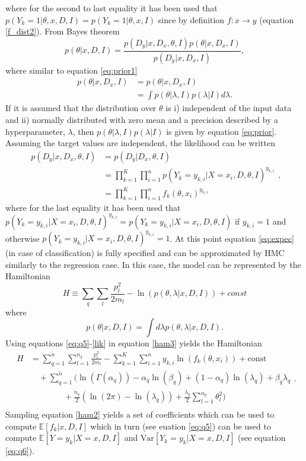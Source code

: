 where for the second to last equality it has been used that $p(Y_k=1|\theta,x,D,I) = p(Y_k=1|\theta,x,I)$ since by definition $f: x\rightarrow y$ (equation \eqref{f_dist2}). From Bayes theorem
\begin{equation}
	p(\theta|x,D,I) =\frac{p(D_y|x,D_x,\theta,I)p(\theta|x,D_x,I)}{p(D_y|x,D_x,I)},
\end{equation}
where similar to equation \eqref{eq:prior1}
\begin{equation}
	\begin{split}
		p(\theta|x,D_x,I) & = p(\theta|x,D_x,I)\\
		& = \int p(\theta|\lambda,I)p(\lambda|I)d\lambda.
	\end{split}
\end{equation}
If it is assumed that the distribution over $\theta$ is i) independent of the input data and ii) normally distributed with zero mean and a precision described by a hyperparameter, $\lambda$, then $p(\theta|\lambda,I)p(\lambda|I)$ is given by equation \eqref{eq:prior}. Assuming the target values are independent, the likelihood can be written~\citep{Fischer1999} 
\begin{equation}
	\begin{split}
		p(D_y|x,D_x,\theta,I) &= p(D_y|D_x,\theta,I)\\
		&=\prod_{k=1}^K\prod_{i=1}^{n}p(Y_k = y_{k,i}|X = x_{i},D,\theta,I)^{y_{k,i}}\\
		&=\prod_{k=1}^K\prod_{i=1}^{n}f_k(\theta,x_i)^{y_{k,i}}
	\end{split},
	\label{lik}
\end{equation}
where for the last equality it has been used that $p(Y_k = y_{k,i}|X = x_{i},D,\theta,I)^{y_{k,i}} = p(Y_k = y_{k,i}|X = x_{i},D,\theta,I)$ if $y_{k,i} = 1$ and otherwise $p(Y_k = y_{k,i}|X = x_{i},D,\theta,I)^{y_{k,i}}=1$. At this point equation \eqref{eq:expec} (in case of classification) is fully specified and can be approximated by HMC similarly to the regression case. In this case, the model can be represented by the Hamiltonian 
\begin{equation}
	H \equiv  \sum_{q}\sum_{l}\frac{p_{l}^2}{2m_{l}}-\ln(p(\theta,\lambda|x,D,I))+const
	\label{ham3}
\end{equation}
where
\begin{equation}
	p(\theta|x,D,I) = \int d\lambda p(\theta,\lambda|x,D,I).
\end{equation}
Using equations \eqref{eq:q5}-\eqref{lik} in equation \eqref{ham3} yields the Hamiltonian
\begin{equation}
	\begin{split}
		H&=\sum_{q=1}^{\tilde{n}}\sum_{l=1}^{n_q}\frac{p_{l}^2}{2m_{l}}-\sum_{k=1}^{K}\sum_{i=1}^{n}y_{k,i}\ln(f_k(\theta,x_i))+\text{const}\\
		&\quad+\sum_{q=1}^{\tilde{n}}\bigg(\ln(\Gamma(\alpha_q))-\alpha_q\ln(\beta_q)+(1-\alpha_q)\ln(\lambda_q)+\beta_q\lambda_q\\
		&\qquad \qquad+\frac{n_q}{2}(\ln(2\pi)-\ln(\lambda_q))+\frac{\lambda_q}{2}\sum_{l=1}^{n_q}\theta_l^2\bigg)\\
	\end{split}.
	\label{ham2}
\end{equation}
Sampling equation \eqref{ham2} yields a set of coefficients which can be used to compute $\mathbb{E}[f_k|x,D,I]$ which in turn (see euation \eqref{eq:q5}) can be used to compute $\mathbb{E}[Y = y_k|X =x,D,I]$ and $\text{Var}[Y_k = y_k|X = x,D,I]$ (see equation \eqref{eq:q6}).

